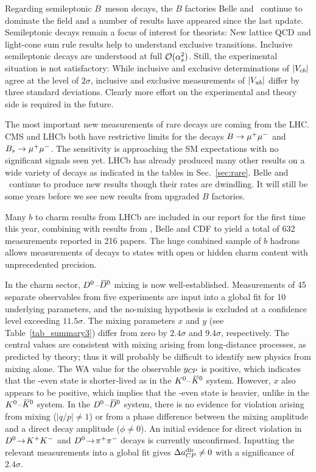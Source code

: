 Regarding semileptonic $B$~meson decays, the $B$ factories Belle
and \babar\ continue to dominate the field and a number of results
have appeared since the last update. Semileptonic decays remain a
focus of interest for theorists: New lattice QCD and light-cone sum
rule results help to understand exclusive transitions. Inclusive
semileptonic decays are understood at full ${\cal
O}(\alpha^2_s)$. Still, the experimental situation is not satisfactory:
While inclusive and exclusive determinations of $|V_{cb}|$ agree at the
level of $2\sigma$, inclusive and exclusive measurements of $|V_{ub}|$
differ by three standard deviations. Clearly more effort on the
experimental and theory side is required in the future.

The most important new measurements of rare decays are coming from the
LHC.  CMS and LHCb both have restrictive limits for the decays
$B\to\mu^+\mu^-$ and $B_s\to\mu^+\mu^-$.  The sensitivity is approaching the SM
expectations with no significant signals seen yet.  LHCb has already
produced many other results on a wide variety of decays as indicated in 
the tables in Sec.~\ref{sec:rare}.  Belle and \babar\ continue to
produce new results though their rates are dwindling.  It will still
be some years before we see new results from upgraded $B$ factories.

Many $b$ to charm results from LHCb are included in our report for the  
first time this year, combining with
results from \babar, Belle and CDF to yield a total of 632  
measurements reported in 216 papers.
The huge combined sample of $b$ hadrons allows measurements of decays  
to states with open or hidden charm
content with unprecedented precision.

In the charm sector, $D^0$--$\kern 0.2em\overline{\kern -0.2em D}{}^0$ mixing is now well-established.
Measurements of 45 separate observables from five experiments are input 
into a global fit for 10 underlying parameters, and the no-mixing 
hypothesis is excluded at a confidence level exceeding 
$11.5\sigma$. The mixing parameters
$x$ and $y$ (see Table~\ref{tab_summary3}) differ from zero by 
$2.4\sigma$ and $9.4\sigma$, respectively. The central values are 
consistent with mixing arising from long-distance processes, as
predicted by theory; thus it will probably be difficult to identify 
new physics from mixing alone. The WA value for the observable $y_{C\!P}$ 
is positive, which indicates that the \CP-even state is shorter-lived 
as in the $K^0$--$\kern 0.2em\overline{\kern -0.2em K}{}^0$ system. However, $x$ also appears to be 
positive, which implies that the \CP-even state is heavier, 
unlike in the $K^0$--$\kern 0.2em\overline{\kern -0.2em K}{}^0$ system. 
%
In the $D^0$--$\kern 0.2em\overline{\kern -0.2em D}{}^0$ system, 
there is no evidence for \CP violation arising from mixing ($|q/p|\neq 1$) or 
from a phase difference between the mixing amplitude and 
a direct decay amplitude ($\phi\neq 0$). An initial evidence for direct
\CP violation in $D^0\!\rightarrow\! K^+K^-$ and $D^0\!\rightarrow\! \pi^+\pi^-$ decays is currently unconfirmed. 
Inputting the relevant measurements into a global 
fit gives $\Delta a^{\rm dir}_{CP}\neq 0$ with a significance 
of $2.4\sigma$.

